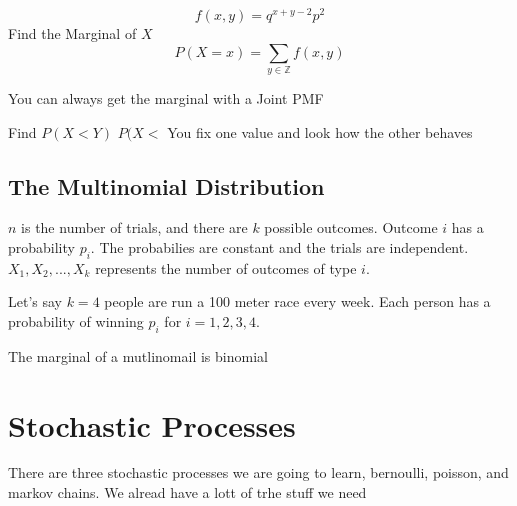 \documentclass{report}
\begin{document}
\begin{example}
    \[
        f(x,y)=q^{x+y-2}p^2
    \]
    Find the Marginal of $X$
    \solution
    \[
        P(X=x)= \sum_{y\in\mathbb Z} f(x,y)
    \]
\end{example}
You can always get the marginal with a Joint PMF

\begin{example}
    Find $P(X<Y)$
    \solution
    $P(X<$
    You fix one value and look how the other behaves
\end{example}

\section{The Multinomial Distribution}
\newcommand{\mult}{\textup{Mult}}
$n$ is the number of trials, and there are $k$ possible outcomes. Outcome $i$ has a probability $p_i$. The probabilies are constant and the trials are independent. $X_1,X_2,...,X_k$ represents the number of outcomes of type $i$. 

Let's say $k=4$ people are run a 100 meter race every week. Each person has a probability of winning $p_i$ for $i=1,2,3,4$. 




The marginal of a mutlinomail is binomial


\chapter{Stochastic Processes}

There are three stochastic processes we are going to learn, bernoulli, poisson, and markov chains. We alread have a lott of trhe stuff we need
\end{document}
